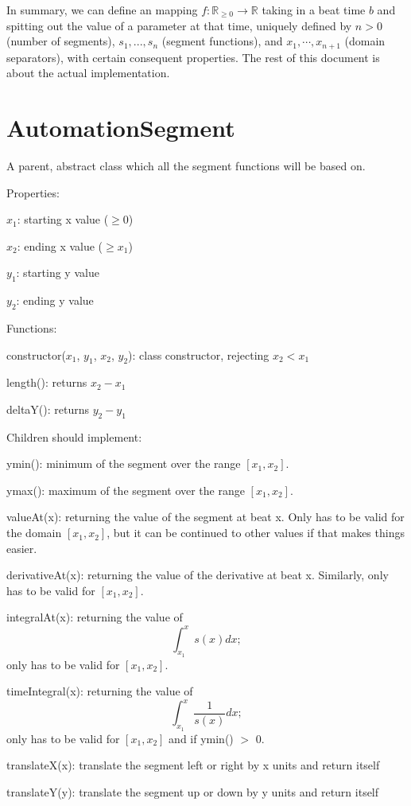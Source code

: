 \documentclass{article}
\begin{document}
In summary, we can define an mapping $f:\mathbb{R}_{\geq 0}\to \mathbb{R}$ taking in a beat time $b$ and spitting out the value of a parameter at that time, uniquely defined by $n>0$ (number of segments), $s_1, ..., s_n$ (segment functions), and $x_1, \cdots, x_{n+1}$ (domain separators), with certain consequent properties. The rest of this document is about the actual implementation.

\section{AutomationSegment}

A parent, abstract class which all the segment functions will be based on.

Properties:

$x_1$: starting x value ($\geq 0$)

$x_2$: ending x value ($\geq x_1$)

$y_1$: starting y value

$y_2$: ending y value

Functions:

constructor($x_1$, $y_1$, $x_2$, $y_2$): class constructor, rejecting $x_2 < x_1$

length(): returns $x_2 - x_1$

deltaY(): returns $y_2 - y_1$

Children should implement:

ymin(): minimum of the segment over the range $[x_1, x_2]$.

ymax(): maximum of the segment over the range $[x_1, x_2]$.

valueAt(x): returning the value of the segment at beat x. Only has to be valid for the domain $[x_1, x_2]$, but it can be continued to other values if that makes things easier.

derivativeAt(x): returning the value of the derivative at beat x. Similarly, only has to be valid for $[x_1, x_2]$.

integralAt(x): returning the value of $$\int_{x_1}^x s(x) dx;$$ only has to be valid for $[x_1, x_2]$.

timeIntegral(x): returning the value of $$\int_{x_1}^x \frac{1}{s(x)} dx;$$ only has to be valid for $[x_1, x_2]$ and if ymin() $>$ 0.

translateX(x): translate the segment left or right by x units and return itself

translateY(y): translate the segment up or down by y units and return itself
\end{document}

